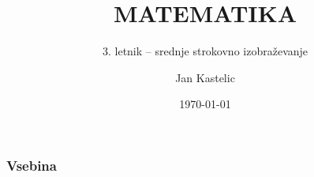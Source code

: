 \documentclass[10pt, aspectratio=169]{beamer}
\title{MATEMATIKA}
\subtitle{3. letnik -- srednje strokovno izobraževanje}
\date{\today}
\author{Jan Kastelic}
\institute[FMF]{Fakulteta za matematiko in fiziko, \\ Univerza v Ljubljani}
\begin{document}
\begin{frame}
	\titlepage
\end{frame}
	

\begin{frame}
	\frametitle{Vsebina}
	\tableofcontents[hideallsubsections]
\end{frame}
	
% 

% 

% 

% 

% 
\end{document}
